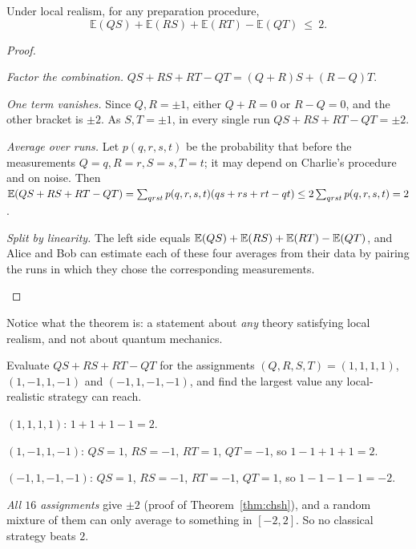 \begin{theorem}\label{thm:chsh}
  Under local realism, for any preparation procedure,
  \[
    \mathbb E(QS)+\mathbb E(RS)+\mathbb E(RT)-\mathbb E(QT)\ \le\ 2 .
  \]
\end{theorem}
\begin{proof}
  \begin{steps}
    \item \emph{Factor the combination.} $QS+RS+RT-QT=(Q+R)S+(R-Q)T$.
    \item \emph{One term vanishes.} Since $Q,R=\pm1$, either $Q+R=0$ or $R-Q=0$, and the other bracket is $\pm2$. As $S,T=\pm1$, in every single run $QS+RS+RT-QT=\pm2$.
    \item \emph{Average over runs.} Let $p(q,r,s,t)$ be the probability that before the measurements $Q=q,R=r,S=s,T=t$; it may depend on Charlie's procedure and on noise. Then $\mathbb{E}(QS+RS+RT-QT)=\sum_{qrst}p(q,r,s,t)(qs+rs+rt-qt)\le2\sum_{qrst}p(q,r,s,t)=2$.
    \item \emph{Split by linearity.} The left side equals $\mathbb{E}(QS)+\mathbb{E}(RS)+\mathbb{E}(RT)-\mathbb{E}(QT)$, and Alice and Bob can estimate each of these four averages from their data by pairing the runs in which they chose the corresponding measurements. \qedhere
  \end{steps}
\end{proof}

Notice what the theorem is: a statement about \emph{any} theory satisfying local realism, and not about quantum mechanics.

\begin{example}\label{ex:deterministic}
  Evaluate $QS+RS+RT-QT$ for the assignments $(Q,R,S,T)=(1,1,1,1)$, $(1,-1,1,-1)$ and $(-1,1,-1,-1)$, and find the largest value any local-realistic strategy can reach.
\end{example}
\begin{solution}
  \begin{steps}
    \item $(1,1,1,1)$: $1+1+1-1=2$.
    \item $(1,-1,1,-1)$: $QS=1$, $RS=-1$, $RT=1$, $QT=-1$, so $1-1+1+1=2$.
    \item $(-1,1,-1,-1)$: $QS=1$, $RS=-1$, $RT=-1$, $QT=1$, so $1-1-1-1=-2$.
    \item \emph{All $16$ assignments} give $\pm2$ (proof of Theorem~\ref{thm:chsh}), and a random mixture of them can only average to something in $[-2,2]$. So no classical strategy beats $2$.
  \end{steps}
\end{solution}

